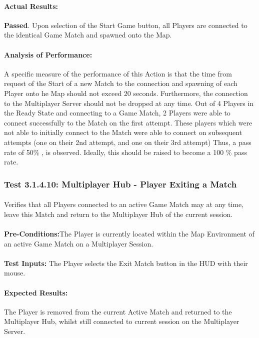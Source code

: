 \documentclass{article}
\begin{document}
    \paragraph{Actual Results:} \textbf{Passed}. Upon selection of the Start Game button, all Players are connected to the identical Game Match and spawned onto the Map. 
    \paragraph{Analysis of Performance:} A specific measure of the performance of this Action is that the time from request of the Start of a new Match to the connection and spawning of each Player onto he Map should not exceed 20 seconds. Furthermore, the connection to the Multiplayer Server should not be dropped at any time. Out of 4 Players in the Ready State and connecting to a Game Match, 2 Players were able to connect successfully to the Match on the first attempt. These players which were not able to initially connect to the Match were able to connect on subsequent attempts (one on their 2nd attempt, and one on their 3rd attempt)  Thus, a pass rate of 50\% , is observed. Ideally, this should be raised to become a 100 \% pass rate.
    
    \subsubsection{Test 3.1.4.10: Multiplayer Hub - Player Exiting a Match}
    \paragraph{} Verifies that all Players connected to an active Game Match may at any time, leave this Match and return to the Multiplayer Hub of the current session.
    \paragraph{}\textbf{Pre-Conditions:}The Player is currently located within the Map Environment of an active Game Match on a Multiplayer Session.
    \paragraph{}\textbf{Test Inputs:} The Player selects the Exit Match button in the HUD with their mouse.
    \paragraph{Expected Results:} The Player is removed from the current Active Match and returned to the Multiplayer Hub, whilst still connected to current session on the Multiplayer Server. 
\end{document}
